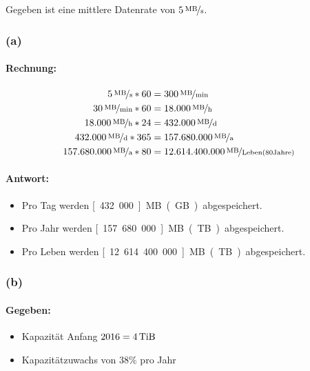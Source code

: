 \documentclass[11pt,a4paper]{article}
\begin{document}
\subsection{} %
Gegeben ist eine mittlere Datenrate von $\unitfrac[5]{MB}{s}$.


\subsubsection{(a)} %
\paragraph{Rechnung:}

\begin{align}
\unitfrac[5]{MB}{s}*60 &= \unitfrac[300]{MB}{min}\\
\unitfrac[30]{MB}{min}*60 &= \unitfrac[18.000]{MB}{h}\\
\unitfrac[18.000]{MB}{h}*24 &=  \unitfrac[432.000]{MB}{d}\\
\unitfrac[432.000]{MB}{d}*365 &= \unitfrac[157.680.000]{MB}{a}\\
\unitfrac[157.680.000]{MB}{a}*80 &= \unitfrac[12.614.400.000]{MB}{Leben(80 Jahre)}
\end{align}

\paragraph{Antwort:}
\begin{itemize}
  \item Pro Tag werden \unit[432.000]{MB} (\unit[430]{GB}) abgespeichert.
  \item Pro Jahr werden \unit[157.680.000]{MB} (\unit[157,68]{TB}) abgespeichert.
  \item Pro Leben werden \unit[12.614.400.000]{MB} (\unit[12614,4]{TB}) abgespeichert.
\end{itemize}


\subsubsection{(b)} %
\paragraph{Gegeben:}

\begin{itemize}
    \item Kapazität Anfang $2016 = \unit[4]{TiB}$
    \item Kapazitätzuwachs von $38\%$ pro Jahr
\end{itemize}
\end{document}
